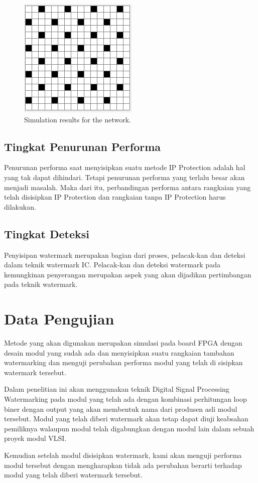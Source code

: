 \begin{figure}[!h]
	\centering
	\includegraphics[scale=0.8]{images/gatePlace}
	\caption{Simulation results for the network.}
	\label{fig_sim}
\end{figure}

\subsection{Tingkat Penurunan Performa}

Penurunan performa saat menyisipkan suatu metode IP Protection adalah
hal yang tak dapat dihindari. Tetapi penurunan performa yang terlalu besar akan
menjadi masalah. Maka dari itu, perbandingan performa antara rangkaian yang
telah disisipkan IP Protection dan rangkaian tanpa IP Protection harus dilakukan.

\subsection{Tingkat Deteksi}

Penyisipan watermark merupakan bagian dari proses, pelacak-kan dan
deteksi dalam teknik watermark IC. Pelacak-kan dan deteksi watermark pada
kemungkinan penyerangan merupakan aspek yang akan dijadikan pertimbangan
pada teknik watermark.

\section{Data Pengujian}

Metode yang akan digunakan merupakan simulasi pada board FPGA
dengan desain modul yang sudah ada dan menyisipkan suatu rangkaian tambahan
watermarking dan menguji perubahan performa modul yang telah di sisipkan
watermark tersebut.

Dalam penelitian ini akan menggunakan teknik Digital Signal Processing
Watermarking pada modul yang telah ada dengan kombinasi perhitungan loop
biner dengan output yang akan membentuk nama dari produsen asli modul
tersebut. Modul yang telah diberi watermark akan tetap dapat diuji keabsahan
pemiliknya walaupun modul telah digabungkan dengan modul lain dalam sebuah
proyek modul VLSI.

Kemudian setelah modul disisipkan watermark, kami akan menguji
performa modul tersebut dengan mengharapkan tidak ada perubahan berarti
terhadap modul yang telah diberi watermark tersebut.
